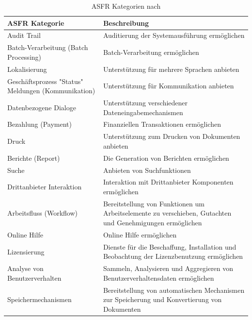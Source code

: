 \begin{table}[h] %
\caption{ASFR Kategorien nach \cite{Ros02}}
\centering
\begin{tabular}{|p{3cm}|p{5cm}|}
	\hline
	\textbf{ASFR Kategorie} & \textbf{Beschreibung} \\ %
	\hline
  	Audit Trail & Auditierung der Systemausf\"uhrung erm\"oglichen \\%
	\hline
	Batch-Verarbeitung (Batch Processing) & Batch-Verarbeitung erm\"oglichen \\
	\hline
	Lokalisierung & Unterst\"utzung f\"ur mehrere Sprachen anbieten \\
	\hline
	Gesch\"aftsprozess "Status" Meldungen (Kommunikation) & Unterst\"utzung f\"ur Kommunikation anbieten \\
	\hline
	Datenbezogene Dialoge & Unterst\"utzung verschiedener Dateneingabemechanismen \\
	\hline
	Bezahlung (Payment) & Finanziellen Transaktionen erm\"oglichen \\
	\hline
	Druck & Unterst\"utzung zum Drucken von Dokumenten anbieten \\
	\hline
	Berichte (Report) & Die Generation von Berichten erm\"oglichen \\
	\hline
	Suche & Anbieten von Suchfunktionen \\
	\hline
	Drittanbieter Interaktion & Interaktion mit Drittanbieter Komponenten erm\"oglichen \\
	\hline
	Arbeitsfluss (Workflow) & Bereitstellung von Funktionen um Arbeitselemente zu verschieben, Gutachten und Genehmigungen erm\"oglichen\\
	\hline
	Online Hilfe & Online Hilfe erm\"oglichen \\
	\hline
	Lizensierung & Dienste f\"ur die Beschaffung, Installation und Beobachtung der Lizenzbenutzung erm\"oglichen \\
	\hline
	Analyse von Benutzerverhalten & Sammeln, Analysieren und Aggregieren von Benutzerverhaltensdaten erm\"oglichen \\
	\hline
	Speichermechanismen & Bereitstellung von automatischen Mechanismen zur Speicherung und Konvertierung von Dokumenten \\
	\hline
\end{tabular}
\label{tab:asfr_category_table}
\end{table}

